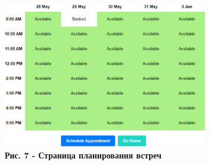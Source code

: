 \begin{figure}[H]
	\centering
	\includegraphics[width=0.8\textwidth]{assets/157}
	\caption*{\bfseries Рис. 7 - Страница планирования встреч}
\end{figure}
